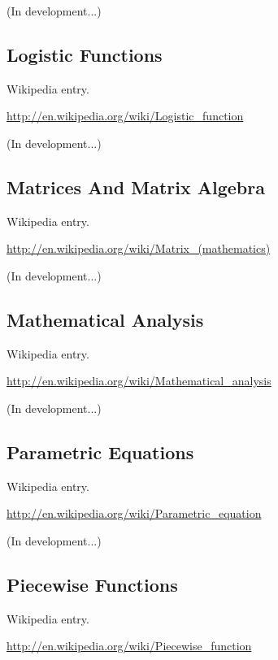 \documentclass[12pt,twoside]{book}
\begin{document}
(In development...)

\subsection[Logistic Functions]{Logistic Functions}

Wikipedia entry.

\href{http://en.wikipedia.org/wiki/Logistic_function}{http://en.wikipedia.org/wiki/Logistic\_function}

(In development...)

\subsection[Matrices And Matrix Algebra]{Matrices And Matrix Algebra}

Wikipedia entry.

\href{http://en.wikipedia.org/wiki/Matrix_(mathematics)}{http://en.wikipedia.org/wiki/Matrix\_(mathematics)}

(In development...)

\subsection[Mathematical Analysis]{Mathematical Analysis}

Wikipedia entry.

\href{http://en.wikipedia.org/wiki/Mathematical_analysis}{http://en.wikipedia.org/wiki/Mathematical\_analysis}

(In development...)

\subsection[Parametric Equations]{Parametric Equations}

Wikipedia entry.

\href{http://en.wikipedia.org/wiki/Parametric_equation}{http://en.wikipedia.org/wiki/Parametric\_equation}

(In development...)

\subsection[Piecewise Functions]{Piecewise Functions}

Wikipedia entry.

\href{http://en.wikipedia.org/wiki/Piecewise_function}{http://en.wikipedia.org/wiki/Piecewise\_function}
\end{document}
